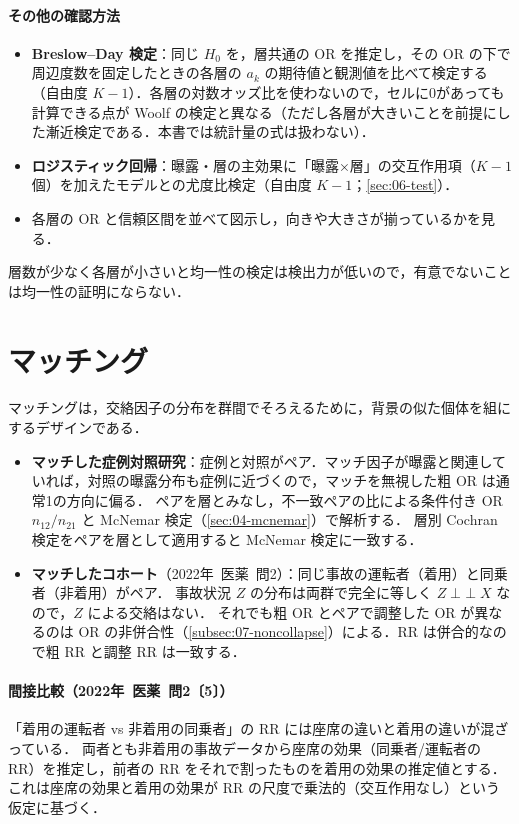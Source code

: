 \documentclass[a4paper,11pt,openany]{ltjsbook}
\newcommand{\tagbox}[2]{\tcbox[on line,boxsep=0.5pt,left=2pt,right=2pt,top=0.5pt,bottom=0.5pt,
  colframe=#1,colback=#1!10,boxrule=0.4pt,arc=1pt]{\scriptsize\bfseries\textcolor{#1}{#2}}}
\newcommand{\Hinshutsu}{\tagbox{bkorange}{頻出}}
\newcommand{\Youchui}{\tagbox{bkpurple}{要注意}}
\newcommand{\kakomon}[2]{\mbox{#1年 医薬 問#2}}
\newcommand{\indep}{\mathop{\perp\!\!\!\perp}}
\begin{document}
\paragraph{その他の確認方法}
\begin{itemize}
\item \textbf{Breslow--Day 検定}：同じ $H_0$ を，層共通の OR を推定し，その OR の下で周辺度数を固定したときの各層の $a_k$ の期待値と観測値を比べて検定する（自由度 $K-1$）．各層の対数オッズ比を使わないので，セルに0があっても計算できる点が Woolf の検定と異なる（ただし各層が大きいことを前提にした漸近検定である．本書では統計量の式は扱わない）．
\item \textbf{ロジスティック回帰}：曝露・層の主効果に「曝露×層」の交互作用項（$K-1$ 個）を加えたモデルとの尤度比検定（自由度 $K-1$；\cref{sec:06-test}）．
\item 各層の OR と信頼区間を並べて図示し，向きや大きさが揃っているかを見る．
\end{itemize}
\Youchui 層数が少なく各層が小さいと均一性の検定は検出力が低いので，有意でないことは均一性の証明にならない．

\section{マッチング}\label{sec:07-match}
\Hinshutsu マッチングは，交絡因子の分布を群間でそろえるために，背景の似た個体を組にするデザインである．
\begin{itemize}
\item \textbf{マッチした症例対照研究}：症例と対照がペア．マッチ因子が曝露と関連していれば，対照の曝露分布も症例に近づくので，マッチを無視した粗 OR は通常1の方向に偏る．
      ペアを層とみなし，不一致ペアの比による条件付き OR $n_{12}/n_{21}$ と McNemar 検定（\cref{sec:04-mcnemar}）で解析する．
      層別 Cochran 検定をペアを層として適用すると McNemar 検定に一致する．
\item \textbf{マッチしたコホート}（\kakomon{2022}{2}）：同じ事故の運転者（着用）と同乗者（非着用）がペア．
      事故状況 $Z$ の分布は両群で完全に等しく $Z\indep X$ なので，$Z$ による交絡はない．
      それでも粗 OR とペアで調整した OR が異なるのは OR の非併合性（\cref{subsec:07-noncollapse}）による．RR は併合的なので粗 RR と調整 RR は一致する．
\end{itemize}
\paragraph{間接比較（\kakomon{2022}{2}〔5〕）}
「着用の運転者 vs 非着用の同乗者」の RR には座席の違いと着用の違いが混ざっている．
両者とも非着用の事故データから座席の効果（同乗者/運転者の RR）を推定し，前者の RR をそれで割ったものを着用の効果の推定値とする．
これは座席の効果と着用の効果が RR の尺度で乗法的（交互作用なし）という仮定に基づく．
\end{document}
